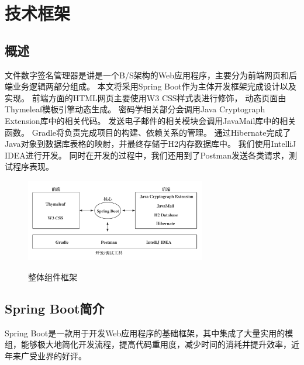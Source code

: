
\chapter{技术框架}

\section{概述}

文件数字签名管理器是讲是一个B/S架构的Web应用程序，主要分为前端网页和后端业务逻辑两部分组成。
本文将采用Spring Boot\cite{springboot}作为主体开发框架完成设计以及实现。
前端方面的HTML网页主要使用W3 CSS\cite{w3css}样式表进行修饰，
动态页面由Thymeleaf\cite{thymeleaf}模板引擎动态生成。
密码学相关部分会调用Java Cryptograph Extension\cite{jce}库中的相关代码。
发送电子邮件的相关模块会调用JavaMail\cite{javamail}库中的相关函数。
Gradle\cite{gradle}将负责完成项目的构建、依赖关系的管理。
通过Hibernate\cite{hibernate}完成了Java对象到数据库表格的映射，并最终存储于H2\cite{h2}内存数据库中。
我们使用IntelliJ IDEA\cite{idea}进行开发。
同时在开发的过程中，我们还用到了Postman\cite{postman}发送各类请求，测试程序表现。

\begin{figure}[!htb]
	\centering
	\includegraphics[width=0.7\textwidth]
	{figures/framework.png}\\
	\caption{整体组件框架}
	\label{fig:framework}
\end{figure}


\section{Spring Boot简介}

Spring Boot是一款用于开发Web应用程序的基础框架，其中集成了大量实用的模组，能够极大地简化开发流程，提高代码重用度，减少时间的消耗并提升效率，近年来广受业界的好评。

